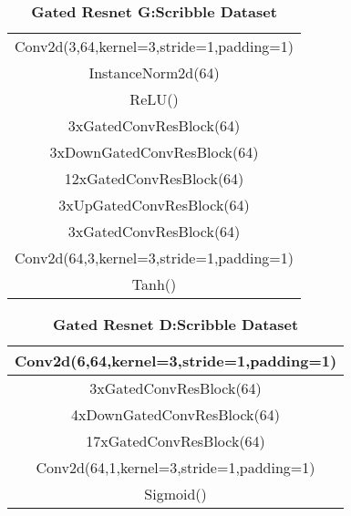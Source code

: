 \begin{table}[ht]
\caption{\textbf{Gated Resnet G:Scribble Dataset}}
\centering %
\begin{tabular}{c} %
\hline
Conv2d(3,64,kernel=3,stride=1,padding=1) \\
InstanceNorm2d(64)\\ %
ReLU() \\
\hline %
3xGatedConvResBlock(64) \\
3xDownGatedConvResBlock(64) \\
12xGatedConvResBlock(64) \\
3xUpGatedConvResBlock(64) \\
3xGatedConvResBlock(64) \\
\hline
Conv2d(64,3,kernel=3,stride=1,padding=1) \\
Tanh() \\
\hline
\end{tabular}
\label{table:resnet_g_scribble} %
\end{table}

\begin{table}[ht]
\caption{\textbf{Gated Resnet D:Scribble Dataset}} %
\centering %
\begin{tabular}{c} %
\hline
Conv2d(6,64,kernel=3,stride=1,padding=1) \\
\hline %
3xGatedConvResBlock(64) \\
4xDownGatedConvResBlock(64) \\
17xGatedConvResBlock(64) \\
\hline
Conv2d(64,1,kernel=3,stride=1,padding=1) \\
Sigmoid() \\
\hline
\end{tabular}
\label{table:resnet_d_scribble} %
\end{table}




